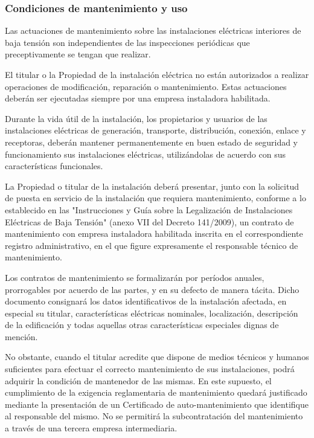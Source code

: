 \documentclass[../main.tex]{subfiles}
\begin{document}
\subsubsection{Condiciones de mantenimiento y uso}
Las actuaciones de mantenimiento sobre las instalaciones eléctricas interiores de baja tensión son independientes de las inspecciones periódicas que preceptivamente se tengan que realizar. \par
\vspace{0.5 cm}
El titular o la Propiedad de la instalación eléctrica no están autorizados a realizar operaciones de modificación, reparación o mantenimiento. Estas actuaciones deberán ser ejecutadas siempre por una empresa instaladora habilitada. \par
\vspace{0.5 cm}
Durante la vida útil de la instalación, los propietarios y usuarios de las instalaciones eléctricas de generación, transporte, distribución, conexión, enlace y receptoras, deberán mantener permanentemente en buen estado de seguridad y funcionamiento sus instalaciones eléctricas, utilizándolas de acuerdo con sus características funcionales. \par
\vspace{0.5 cm}
La Propiedad o titular de la instalación deberá presentar, junto con la solicitud de puesta en servicio de la instalación que requiera mantenimiento, conforme a lo establecido en las "Instrucciones y Guía sobre la Legalización de Instalaciones Eléctricas de Baja Tensión" (anexo VII del Decreto 141/2009), un contrato de mantenimiento con empresa instaladora habilitada inscrita en el correspondiente registro administrativo, en el que figure expresamente el responsable técnico de mantenimiento. \par
\vspace{0.5 cm}
Los contratos de mantenimiento se formalizarán por períodos anuales, prorrogables por acuerdo de las partes, y en su defecto de manera tácita. Dicho documento consignará los datos identificativos de la instalación afectada, en especial su titular, características eléctricas nominales, localización, descripción de la edificación y todas aquellas otras características especiales dignas de mención. \par
\vspace{0.5 cm}
No obstante, cuando el titular acredite que dispone de medios técnicos y humanos suficientes para efectuar el correcto mantenimiento de sus instalaciones, podrá adquirir la condición de mantenedor de las mismas. En este supuesto, el cumplimiento de la exigencia reglamentaria de mantenimiento quedará justificado mediante la presentación de un Certificado de auto-mantenimiento que identifique al responsable del mismo. No se permitirá la subcontratación del mantenimiento a través de una tercera empresa intermediaria. \par
\end{document}
